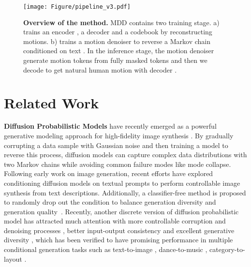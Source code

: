 \documentclass[letterpaper]{article} \usepackage{aaai24}
\begin{document}
\begin{figure*}[t] 
	\centering 
	\texttt{[image: Figure/pipeline\_v3.pdf]} 
	\caption{\textbf{Overview of the method.} MDD contains two training stage. a) trains an encoder , a decoder  and a codebook  by reconstructing motions. b) trains a motion denoiser  to reverse a Markov chain conditioned on text . In the inference stage, the motion denoiser generate motion tokens  from fully masked tokens  and then we decode  to get natural human motion with decoder .}
	\label{framework} 
\end{figure*}

\section{Related Work}

\noindent\textbf{Diffusion Probabilistic Models} \cite{sohldickstein2015deep,song2021scorebased} have recently emerged as a powerful generative modeling approach for high-fidelity image synthesis \cite{ho2020denoising,ho2021cascaded,dhariwal2021diffusion}. 
By gradually corrupting a data sample with Gaussian noise and then training a model to reverse this process, diffusion models can capture complex data distributions with two Markov chains while avoiding common failure modes like mode collapse. 
Following early work on image generation, recent efforts \cite{austin2023structured,dhariwal2021diffusion} have explored conditioning diffusion models on textual prompts to perform controllable image synthesis from text descriptions. Additionally, a classifier-free \cite{ho2022classifierfree} method is proposed to randomly drop out the condition to balance generation diversity and generation quality~\cite{nichol2022glide}.
Recently, another discrete version of diffusion probabilistic model \cite{austin2023structured,sohldickstein2015deep,hoogeboom2021argmax} has attracted much attention with more controllable corruption and denoising processes \cite{austin2023structured}, better input-output consistency \cite{zhu2023discrete} and excellent generative diversity \cite{gu2022vector}, which has been verified to have promising performance in multiple conditional generation tasks such as text-to-image \cite{gu2022vector}, dance-to-music \cite{zhu2023discrete}, category-to-layout \cite{inoue2023layoutdm}.
\end{document}
